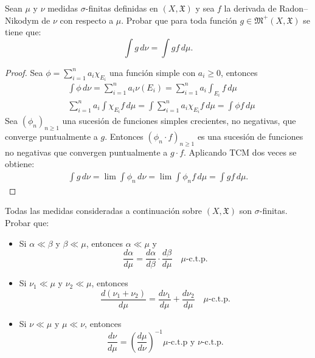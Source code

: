 \documentclass[12pt]{article}
\newenvironment{statement}[2][Ejercicio]{\begin{trivlist}
\item[\hskip \labelsep {\bfseries #1}\hskip \labelsep {\bfseries #2.}]}{\end{trivlist}}
\begin{document}
\begin{statement}{7}
    Sean \(\mu \) y \(\nu \) medidas \(\sigma \)-finitas definidas en \((X, \mathfrak{X}) \) y sea \(f \) la derivada de Radon–Nikodym de \(\nu \) con respecto a \(\mu \). Probar que para toda función \(g \in \mathfrak{M}^+(X, \mathfrak{X}) \) se tiene que:
    \[
        \int g \, d\nu = \int gf \, d\mu.
    \]
\end{statement}

\begin{proof}
    Sea \(\phi = \sum_{i = 1}^n a_i \chi_{E_i} \) una función simple con \(a_i \geq 0 \), entonces \begin{align*}
         & \int \phi \, d\nu = \sum_{i = 1}^n a_i \nu(E_i) = \sum_{i = 1}^n a_i \int_{E_i} f \, d\mu                         \\
         & \sum_{i = 1}^n a_i \int \chi_{E_i} f \, d\mu = \int \sum_{i = 1}^n a_i \chi_{E_i} f \, d\mu = \int \phi f \, d\mu
    \end{align*}
    Sea \((\phi_n)_{n \geq 1} \) una sucesión de funciones simples crecientes, no negativas, que converge puntualmente a \(g \). Entonces \((\phi_n \cdot f)_{n \geq 1} \) es una sucesión
    de funciones no negativas que convergen puntualmente a \(g \cdot f \). Aplicando TCM dos veces se obtiene: \begin{align*}
        \int g \, d \nu = \lim \int \phi_n \, d \nu = \lim \int \phi_n f \, d\mu = \int g f \, d\mu.
    \end{align*}
\end{proof}

\begin{statement}{8}
    Todas las medidas consideradas a continuación sobre \((X, \mathfrak{X}) \) son \(\sigma \)-finitas. Probar que:

    \begin{itemize}
        \item[(a)] Si \(\alpha \ll \beta \) y \(\beta \ll \mu \), entonces \(\alpha \ll \mu \) y
              \[
                  \frac{d\alpha}{d\mu} = \frac{d\alpha}{d\beta} \cdot \frac{d\beta}{d\mu} \quad \mu\text{-c.t.p.}
              \]
        \item[(b)] Si \(\nu_1 \ll \mu \) y \(\nu_2 \ll \mu \), entonces
              \[
                  \frac{d(\nu_1 + \nu_2)}{d\mu} = \frac{d\nu_1}{d\mu} + \frac{d\nu_2}{d\mu} \quad \mu\text{-c.t.p.}
              \]
        \item[(c)] Si \(\nu \ll \mu \) y \(\mu \ll \nu \), entonces
              \[
                  \frac{d\nu}{d\mu} = \left( \frac{d\mu}{d\nu} \right)^{-1} \mu\text{-c.t.p y } \nu\text{-c.t.p.}
              \]
    \end{itemize}
\end{statement}
\end{document}
